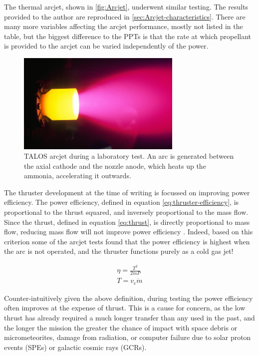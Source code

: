The thermal arcjet, shown in \autoref{fig:Arcjet}, underwent similar testing. The results provided to the author are reproduced in \autoref{sec:Arcjet-characteristics}. There are many more variables affecting the arcjet performance, mostly not listed in the table, but the biggest difference to the PPTs is that the rate at which propellant is provided to the arcjet can be varied independently of the power. 

\begin{figure}
\caption{TALOS arcjet during a laboratory test. An arc is generated between the axial cathode and the nozzle anode, which heats up the ammonia, accelerating it outwards.}
\label{fig:Arcjet}
\centering
\includegraphics[width=0.7\textwidth]{Images/hiparc_betrieb.png}
\end{figure}

The thruster development at the time of writing  is focussed on improving power efficiency. The power efficiency, defined in equation \eqref{eq:thruster-efficiency}, is proportional to the thrust squared, and inversely proportional to the mass flow. Since the thrust, defined in equation \eqref{eq:thrust}, is directly proportional to mass flow, reducing mass flow will not improve power efficiency \parencite{Wollenhaupt2011}. Indeed, based on this criterion some of the arcjet tests found that the power efficiency is highest when the arc is not operated, and the thruster functions purely as a cold gas jet! 

\begin{subequations}
\begin{gather}
\eta = \frac{T^2}{2\dot{m}P} \label{eq:thruster-efficiency}\\
T = v_e\dot{m} \label{eq:thrust} 
\end{gather}
\end{subequations}

Counter-intuitively given the above definition, during testing the power efficiency often improves at the expense of thrust. This is a cause for concern, as the low thrust has already required a much longer transfer than any used in the past, and the longer the mission the greater the chance of impact with space debris or micrometeorites, damage from radiation, or computer failure due to solar proton events (SPEs) or galactic cosmic rays (GCRs).

